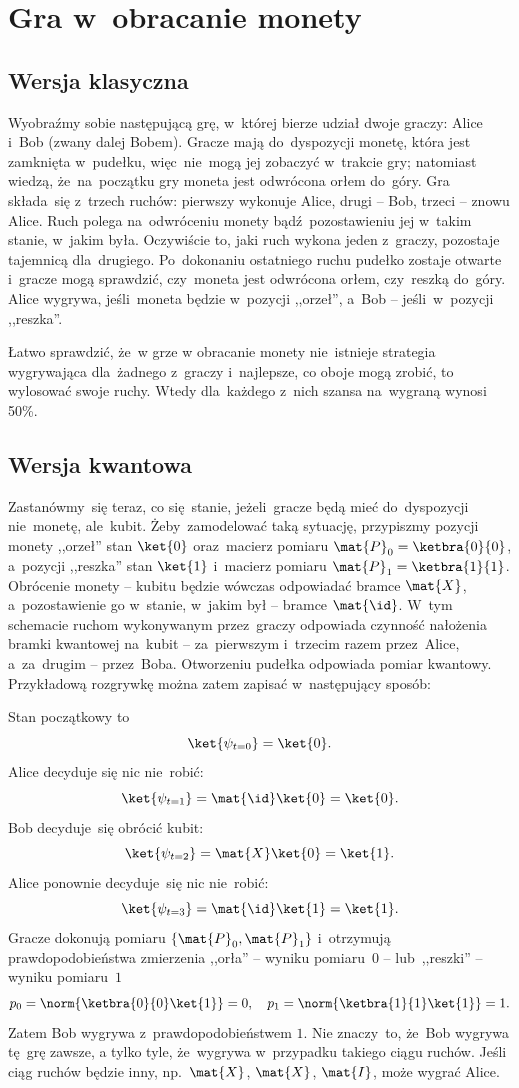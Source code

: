 
\section{Gra w~obracanie monety}
\subsection{Wersja klasyczna}
Wyobraźmy sobie następującą grę, w~której bierze udział dwoje graczy:
Alice i~Bob (zwany dalej Bobem). Gracze mają do~dyspozycji
monetę, która jest zamknięta w~pudełku, więc~nie~mogą jej zobaczyć
w~trakcie gry; natomiast wiedzą, że~na~początku gry moneta jest
odwrócona orłem do~góry. Gra składa~się z~trzech ruchów: pierwszy
wykonuje Alice, drugi -- Bob, trzeci -- znowu Alice. Ruch polega
na~odwróceniu monety bądź~pozostawieniu jej w~takim stanie, w~jakim
była. Oczywiście to, jaki ruch wykona jeden z~graczy, pozostaje
tajemnicą dla~drugiego. Po~dokonaniu ostatniego ruchu pudełko zostaje
otwarte i~gracze mogą sprawdzić, czy~moneta jest odwrócona orłem,
czy~reszką do~góry. Alice wygrywa, jeśli~moneta będzie w~pozycji
,,orzeł'', a~Bob -- jeśli~w~pozycji ,,reszka''.

Łatwo sprawdzić, że~w grze w obracanie monety nie~istnieje strategia
wygrywająca dla~żadnego z~graczy i~najlepsze, co oboje mogą zrobić, to
wylosować swoje ruchy. Wtedy dla~każdego z~nich szansa na~wygraną wynosi
50\%.

\subsection{Wersja kwantowa}
Zastanówmy~się teraz, co się~stanie, jeżeli~gracze będą mieć do~dyspozycji nie~monetę,
ale~kubit.
Żeby~zamodelować taką sytuację, przypiszmy pozycji monety ,,orzeł'' stan $\ket{0}$ oraz~macierz
pomiaru $\mat{P}_0=\ketbra{0}{0}$, a~pozycji ,,reszka''
stan $\ket{1}$ i~macierz pomiaru $\mat{P}_1=\ketbra{1}{1}$. Obrócenie monety --
kubitu będzie wówczas odpowiadać bramce $\mat{X}$, a~pozostawienie go w~stanie, w~jakim był
-- bramce $\mat{\id}$. W~tym schemacie ruchom wykonywanym przez~graczy odpowiada czynność nałożenia bramki
kwantowej na~kubit -- za~pierwszym i~trzecim razem przez~Alice, a~za~drugim -- przez~Boba.
Otworzeniu pudełka odpowiada pomiar kwantowy.
Przykładową rozgrywkę można zatem zapisać w~następujący sposób:

Stan początkowy to
$$
	\ket{\psi_{t=0}}=\ket{0}.
$$
Alice decyduje się nic nie~robić:
$$
	\ket{\psi_{t=1}}=\mat{\id}\ket{0}=\ket{0}.
$$
Bob decyduje~się obrócić kubit:
$$
	\ket{\psi_{t=2}}=\mat{X}\ket{0}=\ket{1}.
$$
Alice ponownie decyduje~się nic nie~robić:
$$
	\ket{\psi_{t=3}}=\mat{\id}\ket{1}=\ket{1}.
$$
Gracze dokonują pomiaru $\{\mat{P}_0,\mat{P}_1\}$ i~otrzymują
prawdopodobieństwa zmierzenia ,,orła'' -- wyniku pomiaru~$0$ -- lub~,,reszki'' -- wyniku pomiaru~$1$
$$
	p_0=\norm{\ketbra{0}{0}\ket{1}}=0, \quad p_1=\norm{\ketbra{1}{1}\ket{1}}=1.
$$
Zatem Bob wygrywa z~prawdopodobieństwem $1$. Nie znaczy~to, że~Bob wygrywa
tę~grę zawsze, a tylko tyle, że~wygrywa w~przypadku takiego ciągu ruchów.
Jeśli ciąg ruchów będzie inny, np.~$\mat{X}$, $\mat{X}$, $\mat{I}$, może wygrać Alice.

